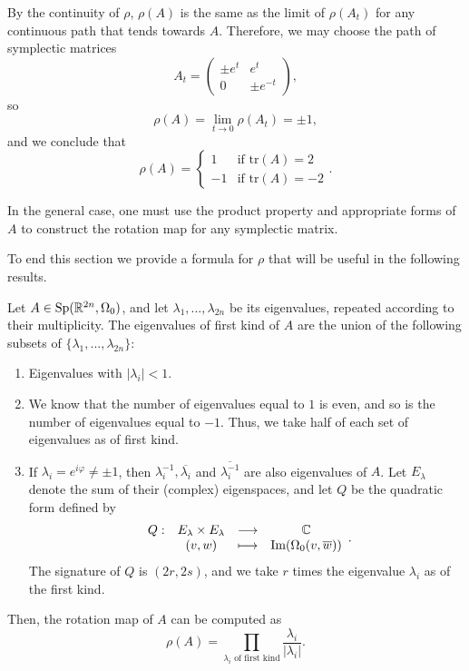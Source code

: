 \begin{enumerate}
	By the continuity of $\rho$, $\rho(A)$ is the same as the limit of $\rho(A_t)$ for any continuous path that tends towards $A$. Therefore, we may choose the path of symplectic matrices
	\[A_t = \begin{pmatrix} \pm e^t & e^t \\ 0 & \pm e^{-t} \end{pmatrix} ,\]
	so
	\[\rho(A) = \lim_{t \rightarrow 0} \rho(A_t) = \pm 1 ,\]
	and we conclude that
	\[\rho(A) = \left\{ \begin{array}{lc} 1 & \text{if tr}(A) = 2 \\ -1 & \text{if tr}(A) = -2 \end{array} \right. .\]
\end{enumerate}

In the general case, one must use the product property and appropriate forms of $A$ to construct the rotation map for any symplectic matrix.

To end this section we provide a formula for $\rho$ that will be useful in the following results.

\begin{lema} \label{rotationformula}
Let $A \in \text{Sp}(\mathbb{R}^{2n},\Omega_0)$, and let $\lambda_1,...,\lambda_{2n}$ be its eigenvalues, repeated according to their multiplicity. The eigenvalues of first kind of $A$ are the union of the following subsets of $\{\lambda_1,...,\lambda_{2n}\}$:
\begin{enumerate}
	\item Eigenvalues with $|\lambda_i| < 1$.
	\item We know that the number of eigenvalues equal to $1$ is even, and so is the number of eigenvalues equal to $-1$. Thus, we take half of each set of eigenvalues as of first kind.
	\item If $\lambda_i = e^{i \varphi} \neq \pm 1$, then $\lambda_i^{-1}, \overline{\lambda_i}$ and $\overline{\lambda_i^{-1}}$ are also eigenvalues of $A$. Let $E_{\lambda}$ denote the sum of their (complex) eigenspaces, and let $Q$ be the quadratic form defined by
	\[\begin{array}{rccc} Q : & E_{\lambda} \times E_{\lambda} & \longrightarrow & \mathbb{C} \\ & (v,w) & \longmapsto & \text{Im}(\Omega_0(v,\overline{w})) \end{array} .\]
	The signature of $Q$ is $(2r,2s)$, and we take $r$ times the eigenvalue $\lambda_i$ as of the first kind.
\end{enumerate}

Then, the rotation map of $A$ can be computed as
\[\rho(A) = \prod_{\lambda_i \text{ of first kind}} \frac{\lambda_i}{|\lambda_i|} .\]
\end{lema}

